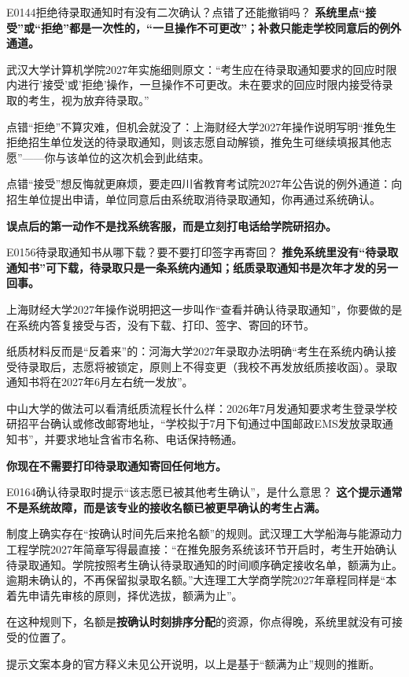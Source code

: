 \begin{qa}{E0144}{拒绝待录取通知时有没有二次确认？点错了还能撤销吗？}
\textbf{系统里点“接受”或“拒绝”都是一次性的，“一旦操作不可更改”；补救只能走学校同意后的例外通道。}

武汉大学计算机学院2027年实施细则原文：“考生应在待录取通知要求的回应时限内进行'接受'或'拒绝'操作，一旦操作不可更改。未在要求的回应时限内接受待录取的考生，视为放弃待录取。”

点错“拒绝”不算灾难，但机会就没了：上海财经大学2027年操作说明写明“推免生拒绝招生单位发送的待录取通知，则该志愿自动解锁，推免生可继续填报其他志愿”——你与该单位的这次机会到此结束。

点错“接受”想反悔就更麻烦，要走四川省教育考试院2027年公告说的例外通道：向招生单位提出申请，单位同意后由系统取消待录取通知，你再通过系统确认。

\textbf{误点后的第一动作不是找系统客服，而是立刻打电话给学院研招办。}
\end{qa}

\begin{qa}{E0156}{待录取通知书从哪下载？要不要打印签字再寄回？}
\textbf{推免系统里没有“待录取通知书”可下载，待录取只是一条系统内通知；纸质录取通知书是次年才发的另一回事。}

上海财经大学2027年操作说明把这一步叫作“查看并确认待录取通知”，你要做的是在系统内答复接受与否，没有下载、打印、签字、寄回的环节。

纸质材料反而是“反着来”的：河海大学2027年录取办法明确“考生在系统内确认接受待录取后，志愿将被锁定，原则上不得变更（我校不再发放纸质接收函）。录取通知书将在2027年6月左右统一发放”。

中山大学的做法可以看清纸质流程长什么样：2026年7月发通知要求考生登录学校研招平台确认或修改邮寄地址，“学校拟于7月下旬通过中国邮政EMS发放录取通知书”，并要求地址含省市名称、电话保持畅通。

\textbf{你现在不需要打印待录取通知寄回任何地方。}
\end{qa}

\begin{qa}{E0164}{确认待录取时提示“该志愿已被其他考生确认”，是什么意思？}
\textbf{这个提示通常不是系统故障，而是该专业的接收名额已被更早确认的考生占满。}

制度上确实存在“按确认时间先后来抢名额”的规则。武汉理工大学船海与能源动力工程学院2027年简章写得最直接：“在推免服务系统该环节开启时，考生开始确认待录取通知。学院按照考生确认待录取通知的时间顺序确定接收名单，额满为止。逾期未确认的，不再保留拟录取名额。”大连理工大学商学院2027年章程同样是“本着先申请先审核的原则，择优选拔，额满为止”。

在这种规则下，名额是\textbf{按确认时刻排序分配}的资源，你点得晚，系统里就没有可接受的位置了。

提示文案本身的官方释义未见公开说明，以上是基于“额满为止”规则的推断。
\end{qa}

